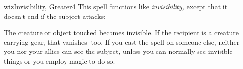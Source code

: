 
\begin{spellcard}{wiz}{Invisibility, Greater}{4}
  \newcommand{\name}{Invisibility, Greater}
  \newcommand{\school}{illusion}
  \newcommand{\subschool}{glamer}
  \newcommand{\descriptor}{NULL}
  \newcommand{\spelllevel}{4}
  \newcommand{\castingtime}{1 standard action}
  \newcommand{\components}{V, S}
  \newcommand{\costlycomponents}{0}
  \newcommand{\range}{personal or touch}
  \newcommand{\area}{NULL}
  \newcommand{\effect}{NULL}
  \newcommand{\targets}{you or creature touched}
  \newcommand{\duration}{1 round/level}
  \newcommand{\dismissible}{1}
  \newcommand{\shapeable}{0}
  \newcommand{\savingthrow}{Will negates (harmless)}
  \newcommand{\spellresistance}{yes (harmless)}
  \newcommand{\source}{PFRPG Core}
  \newcommand{\verbal}{1}
  \newcommand{\somatic}{1}
  \newcommand{\material}{0}
  \newcommand{\focus}{0}
  \newcommand{\divinefocus}{0}
  \newcommand{\deity}{NULL}
  \newcommand{\SLALevel}{4}
  \newcommand{\domain}{NULL}
  \newcommand{\acid}{0}
  \newcommand{\air}{0}
  \newcommand{\chaotic}{0}
  \newcommand{\cold}{0}
  \newcommand{\curse}{0}
  \newcommand{\darkness}{0}
  \newcommand{\death}{0}
  \newcommand{\disease}{0}
  \newcommand{\earth}{0}
  \newcommand{\electricity}{0}
  \newcommand{\emotion}{0}
  \newcommand{\evil}{0}
  \newcommand{\fear}{0}
  \newcommand{\fire}{0}
  \newcommand{\force}{0}
  \newcommand{\good}{0}
  \newcommand{\languagedependent}{0}
  \newcommand{\lawful}{0}
  \newcommand{\light}{0}
  \newcommand{\mindaffecting}{0}
  \newcommand{\pain}{0}
  \newcommand{\poison}{0}
  \newcommand{\shadow}{0}
  \newcommand{\sonic}{0}
  \newcommand{\water}{0}
  \newcommand{\linktext}{Invisibility, Greater}
  \newcommand{\id}{299}
  \newcommand{\materialcosts}{NULL}
  \newcommand{\bloodline}{NULL}
  \newcommand{\patron}{NULL}
  \newcommand{\mythictext}{NULL}
  \newcommand{\augmented}{NULL}
  \newcommand{\hauntstatistics}{NULL}
  \newcommand{\ruse}{0}
  \newcommand{\draconic}{0}
  \newcommand{\meditative}{0}
  \spellcardinfo[0.55]{}
  This spell functions like \emph{invisibility,} except that it doesn't
  end if the subject attacks:

  The creature or object touched becomes invisible. If the re\-ci\-pient is a
  creature carrying gear, that vanishes, too. If you cast the spell on
  someone else, neither you nor your allies can see the subject, unless
  you can normally see invisible things or you employ magic to do so.


\end{spellcard}
